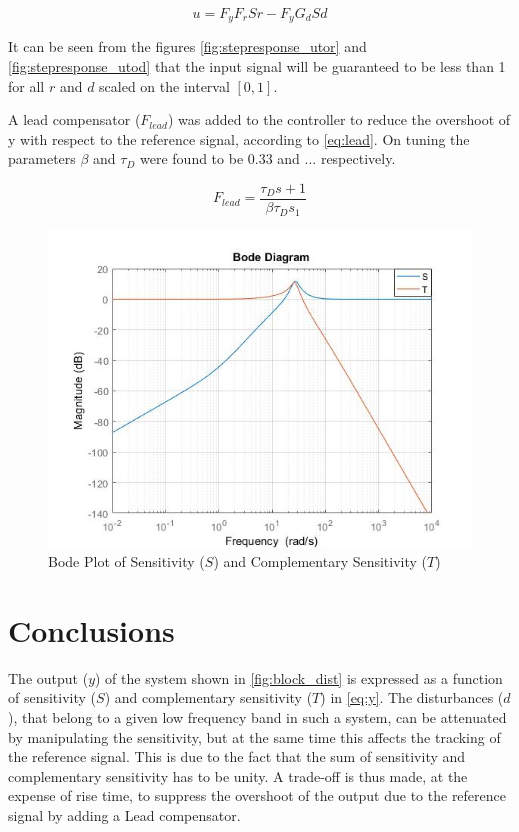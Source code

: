 \documentclass[a4paper]{article}
\begin{document}
\begin{equation}
u=F_yF_rSr - F_yG_dSd
\label{eq:u}
\end{equation}

It can be seen from the figures \cref{fig:stepresponse_utor} and \cref{fig:stepresponse_utod} that the input signal will be guaranteed to be less than 1 for all $r$ and $d$ scaled on the interval $[0,1]$.

A lead compensator ($F_{lead}$) was added to the controller to reduce the overshoot of y with respect to the reference signal, according to \cref{eq:lead}. On tuning the parameters $\beta$ and $\tau_D$ were found to be 0.33 and ... respectively.

\begin{equation}
F_{lead}=\frac{\tau_Ds+1}{\beta\tau_Ds_1}
\label{eq:lead}
\end{equation}

\begin{figure}[!ht]
\centering
\includegraphics[width=.8\linewidth]{ST}
\caption{Bode Plot of Sensitivity ($S$) and Complementary Sensitivity ($T$)}
\label{fig:st}
\end{figure}
\section{Conclusions}
The output ($y$) of the system shown in \cref{fig:block_dist} is expressed as a function of sensitivity ($S$) and complementary sensitivity ($T$) in \cref{eq:y}. 
The disturbances ($d$), that belong to a given low frequency band in such a system, can be attenuated by manipulating the sensitivity, but at the same time this affects the tracking of the reference signal. This is due to the fact that the sum of sensitivity and complementary sensitivity has to be unity. A trade-off is thus made, at the expense of rise time, to suppress the overshoot of the output due to the reference signal by adding a Lead compensator.
\end{document}
